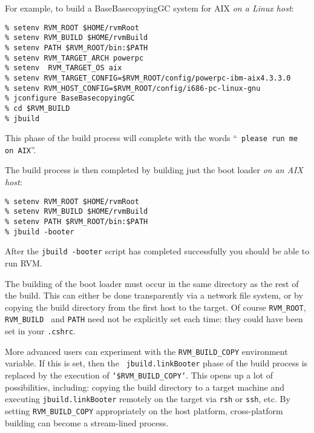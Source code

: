 For example, to build a BaseBasecopyingGC system for AIX {\em on a Linux
host}:
\begin{verbatim}
% setenv RVM_ROOT $HOME/rvmRoot
% setenv RVM_BUILD $HOME/rvmBuild
% setenv PATH $RVM_ROOT/bin:$PATH
% setenv RVM_TARGET_ARCH powerpc
% setenv  RVM_TARGET_OS aix
% setenv RVM_TARGET_CONFIG=$RVM_ROOT/config/powerpc-ibm-aix4.3.3.0
% setenv RVM_HOST_CONFIG=$RVM_ROOT/config/i686-pc-linux-gnu
% jconfigure BaseBasecopyingGC
% cd $RVM_BUILD
% jbuild
\end{verbatim}

This phase of the build process will complete with the words ``{\tt
  please run me on AIX}''.


The build process is then completed by building just the boot loader {\em
  on an AIX host}:

\begin{verbatim}
% setenv RVM_ROOT $HOME/rvmRoot
% setenv RVM_BUILD $HOME/rvmBuild
% setenv PATH $RVM_ROOT/bin:$PATH
% jbuild -booter
\end{verbatim}

After the {\tt jbuild -booter} script has completed successfully you should be able 
to run RVM. 

The building of the boot loader must occur in the same directory as
the rest of the build.  This can either be done transparently via a
network file system, or by copying the build directory from the first
host to the target.  Of course {\tt RVM\_ROOT}, {\tt RVM\_BUILD }
and {\tt PATH} need not be explicitly set each time: they could have
been set in your {\tt .cshrc}.

More advanced users can experiment with the {\tt RVM\_BUILD\_COPY}
environment variable.  If this is set, then the {\tt
  jbuild.linkBooter} phase of the build process is replaced by the
execution of {\tt `\$RVM\_BUILD\_COPY`}.  This opens up a lot of
possibilities, including: copying the build directory to a target
machine and executing {\tt jbuild.linkBooter} remotely on the target
via {\tt rsh} or {\tt ssh}, etc.  By setting {\tt RVM\_BUILD\_COPY}
appropriately on the host platform, cross-platform building can become
a stream-lined process.









